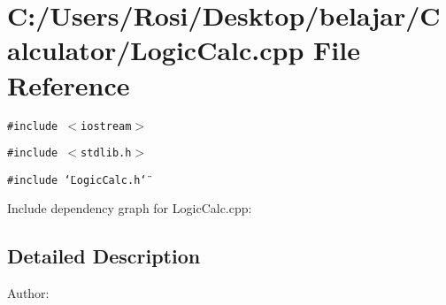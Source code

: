 \section{C:/Users/Rosi/Desktop/belajar/Calculator/Logic\-Calc.cpp File Reference}
\label{_logic_calc_8cpp}
{\tt \#include $<$iostream$>$}\par
{\tt \#include $<$stdlib.h$>$}\par
{\tt \#include \char`\"{}Logic\-Calc.h\char`\"{}}\par


Include dependency graph for Logic\-Calc.cpp:

\subsection{Detailed Description}
\begin{Desc}
\item[Author:]\end{Desc}
